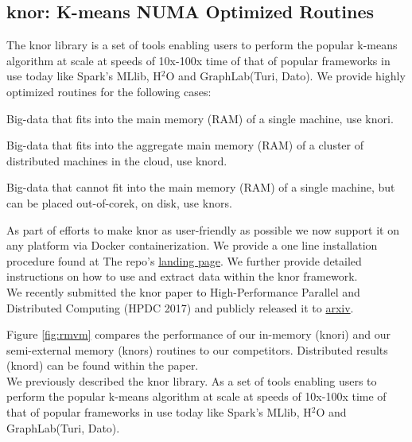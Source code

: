 \documentclass[simplex.tex]{subfiles}
\begin{document}
\subsection{knor: K-means NUMA Optimized Routines}


The \textsf{knor} library is a set of tools enabling users to perform the
popular k-means algorithm at scale at speeds of 10x-100x time of that of popular
frameworks in use today like Spark's MLlib, H$^2$O and GraphLab(Turi, Dato).
We provide highly optimized routines for the
following cases:

\begin{compactitem}
    \item Big-data that fits into the main memory (RAM) of a single machine, use
        \textsf{knori}. \newline
    \item Big-data that fits into the aggregate main memory (RAM) of a cluster
        of distributed machines in the cloud, use \textsf{knord}. \newline
    \item Big-data that cannot fit into the main memory (RAM) of a single machine,
        but can be placed out-of-corek, on disk, use \textsf{knors}.
\end{compactitem}

As part of efforts to make \textsf{knor} as user-friendly as possible we now
support it on any platform via Docker containerization. We provide a one line
installation procedure found at The repo's
\href{https://github.com/disa-mhembere/knor/}{landing page}.
We further provide detailed instructions on how to use and extract data within
the \textsf{knor} framework.\\


We recently submitted the \textsf{knor} paper to High-Performance Parallel and
Distributed Computing (HPDC 2017) and publicly released it to
\href{https://arxiv.org/abs/1606.08905}{arxiv}.

Figure \ref{fig:rmvm} compares the performance of our in-memory (\textsf{knori})
and our semi-external memory (\textsf{knors}) routines to our competitors.
Distributed results (\textsf{knord}) can be found within the paper.\\


We previously described the \textsf{knor} library. As a set of tools enabling
users to perform the popular k-means algorithm at scale at speeds of 10x-100x
time of that of popular frameworks in use today like Spark's MLlib, H$^2$O
and GraphLab(Turi, Dato). \\
\end{document}
